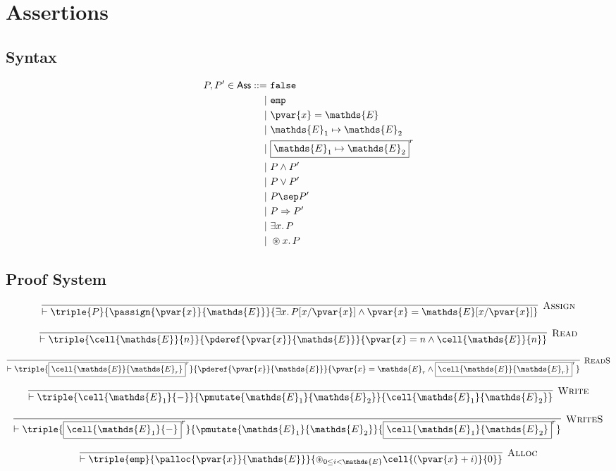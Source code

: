\section{Assertions}

\subsection{Syntax}

\begin{align*}
P, P' \in \mathsf{Ass} ::=&
\ \mathtt{false} \\
|&\ \mathtt{emp} \\
|&\ \pvar{x} = \mathds{E} \\
|&\ \mathds{E}_1 \mapsto \mathds{E}_2 \\
|&\ \boxed{\mathds{E}_1 \mapsto \mathds{E}_2}^r \\
|&\ P \land P' \\
|&\ P \lor P' \\
|&\ P \sep P' \\
|&\ P \Rightarrow P' \\
|&\ \exists x \ldotp P \\
|&\ \circledast x \ldotp P
\end{align*}

\subsection{Proof System}

\[
\infer[\textsc{Assign}]
{
	\vdash \triple
	{P}
	{\passign{\pvar{x}}{\mathds{E}}}
	{\exists x\ldotp P[x/\pvar{x}] \land \pvar{x} = \mathds{E}[x/\pvar{x}]}
}
{}
\]

\[
\infer[\textsc{Read}]
{
	\vdash \triple
	{\cell{\mathds{E}}{n}}
	{\pderef{\pvar{x}}{\mathds{E}}}
	{\pvar{x} = n \land \cell{\mathds{E}}{n}}
}
{}
\]

\[
\infer[\textsc{ReadS}]
{
	\vdash \triple
	{\boxed{\cell{\mathds{E}}{\mathds{E}_r}}^r}
	{\pderef{\pvar{x}}{\mathds{E}}}
	{\pvar{x} = \mathds{E}_r \land \boxed{\cell{\mathds{E}}{\mathds{E}_r}}^r}
}
{}
\]

\[
\infer[\textsc{Write}]
{
	\vdash \triple
	{\cell{\mathds{E}_1}{-}}
	{\pmutate{\mathds{E}_1}{\mathds{E}_2}}
	{\cell{\mathds{E}_1}{\mathds{E}_2}}
}
{}
\]

\[
\infer[\textsc{WriteS}]
{
	\vdash \triple
	{\boxed{\cell{\mathds{E}_1}{-}}^r}
	{\pmutate{\mathds{E}_1}{\mathds{E}_2}}
	{\boxed{\cell{\mathds{E}_1}{\mathds{E}_2}}^r}
}
{}
\]

\[
\infer[\textsc{Alloc}]
{
	\vdash \triple
	{\mathtt{emp}}
	{\palloc{\pvar{x}}{\mathds{E}}}
	{\circledast_{0 \leq i < \mathds{E}}\cell{(\pvar{x} + i)}{0}}
}
{}
\]

